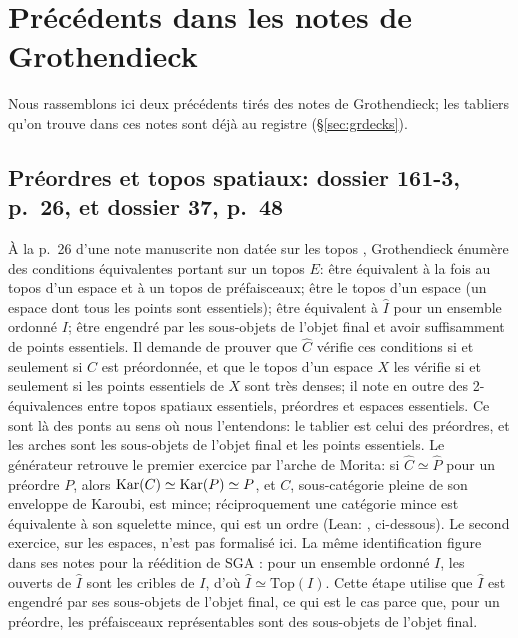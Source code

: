 \section{Précédents dans les notes de Grothendieck}\label{sec:precedents}

Nous rassemblons ici deux précédents tirés des notes de Grothendieck; les tabliers qu'on trouve dans ces notes sont déjà au registre (\S\ref{sec:grdecks}).

\subsection{Préordres et topos spatiaux: dossier 161-3, p.~26, et dossier 37, p.~48}

À la p.~26 d'une note manuscrite non datée sur les topos \cite{grothendieck-161-3}, Grothendieck énumère des conditions équivalentes portant sur un topos $E$: être équivalent à la fois au topos d'un espace et à un topos de préfaisceaux; être le topos d'un espace  (un espace dont tous les points sont essentiels); être équivalent à $\widehat I$ pour un ensemble ordonné $I$; être engendré par les sous-objets de l'objet final et avoir suffisamment de points essentiels. Il demande de prouver que $\widehat C$ vérifie ces conditions si et seulement si $C$ est préordonnée, et que le topos d'un espace $X$ les vérifie si et seulement si les points essentiels de $X$ sont très denses; il note en outre des 2-équivalences entre topos spatiaux essentiels, préordres et espaces essentiels. Ce sont là des ponts au sens où nous l'entendons: le tablier est celui des préordres, et les arches sont les sous-objets de l'objet final et les points essentiels. Le générateur retrouve le premier exercice par l'arche de Morita: si $\widehat C\simeq\widehat P$ pour un préordre $P$, alors $\operatorname{Kar}(C)\simeq\operatorname{Kar}(P)\simeq P$, et $C$, sous-catégorie pleine de son enveloppe de Karoubi, est mince; réciproquement une catégorie mince est équivalente à son squelette mince, qui est un ordre (Lean: , ci-dessous). Le second exercice, sur les espaces, n'est pas formalisé ici. La même identification figure dans ses notes pour la réédition de SGA \cite[p.~48]{grothendieck-37}: pour un ensemble ordonné $I$, les ouverts de $\widehat I$ sont les cribles de $I$, d'où $\widehat I\simeq\mathrm{Top}(I)$. Cette étape utilise que $\widehat I$ est engendré par ses sous-objets de l'objet final, ce qui est le cas parce que, pour un préordre, les préfaisceaux représentables sont des sous-objets de l'objet final.

